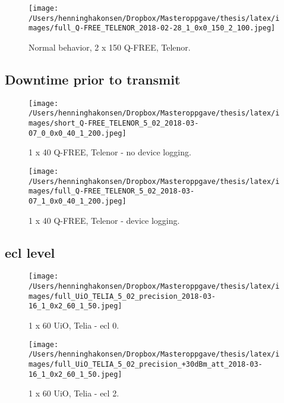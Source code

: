 \documentclass[USenglish]{ifimaster}  %
\begin{document}
\begin{figure}[H]
  \centering
  \texttt{[image: /Users/henninghakonsen/Dropbox/Masteroppgave/thesis/latex/images/full\_Q-FREE\_TELENOR\_2018-02-28\_1\_0x0\_150\_2\_100.jpeg]}
  \caption{Normal behavior, 2 x 150 Q-FREE, Telenor.}
  \label{figure:2x150_QFREE_TELENOR}
\end{figure}

\subsection{Downtime prior to transmit} \label{ssection:downtimeprior}
\begin{figure}[H]
  \centering
  \texttt{[image: /Users/henninghakonsen/Dropbox/Masteroppgave/thesis/latex/images/short\_Q-FREE\_TELENOR\_5\_02\_2018-03-07\_0\_0x0\_40\_1\_200.jpeg]}
  \caption{1 x 40 Q-FREE, Telenor - no device logging.}
  \label{figure:1x40_QFREE_TELENOR_0LOG}
\end{figure}

\begin{figure}[H]
  \centering
  \texttt{[image: /Users/henninghakonsen/Dropbox/Masteroppgave/thesis/latex/images/full\_Q-FREE\_TELENOR\_5\_02\_2018-03-07\_1\_0x0\_40\_1\_200.jpeg]}
  \caption{1 x 40 Q-FREE, Telenor - device logging.}
  \label{figure:1x40_QFREE_TELENOR_1LOG}
\end{figure}

\subsection{\acrshort{ecl} level} \label{ssection:ecllevel}
\begin{figure}[H]
  \centering
  \texttt{[image: /Users/henninghakonsen/Dropbox/Masteroppgave/thesis/latex/images/full\_UiO\_TELIA\_5\_02\_precision\_2018-03-16\_1\_0x2\_60\_1\_50.jpeg]}
  \caption{1 x 60 UiO, Telia - \acrshort{ecl} 0.}
  \label{figure:1x60_UIO_TELIA_ECL_0}
\end{figure}

\begin{figure}[H]
  \centering
  \texttt{[image: /Users/henninghakonsen/Dropbox/Masteroppgave/thesis/latex/images/full\_UiO\_TELIA\_5\_02\_precision\_+30dBm\_att\_2018-03-16\_1\_0x2\_60\_1\_50.jpeg]}
  \caption{1 x 60 UiO, Telia - \acrshort{ecl} 2.}
  \label{figure:1x60_UIO_TELIA_ECL_2}
\end{figure}
\end{document}
